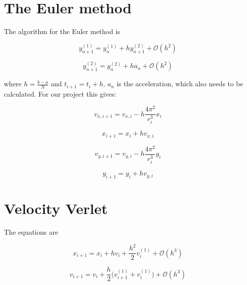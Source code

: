 \documentclass[11pt]{article}
\begin{document}
\section{The Euler method}

\begin{flushleft}
The algorithm for the Euler method is

\begin{equation}
y^{(1)}_{n+1} = y_n^{(1)} + hy_{n+1}^{(2)} + \mathcal{O}(h^2) 
\end{equation}

\begin{equation}
y^{(2)}_{n+1} = y^{(2)}_n +ha_n + \mathcal{O}(h^2)
\end{equation}


where $h = \frac{b-a}{N}$ and $t_{i+1} = t_i + h$. $a_n$ is the acceleration, which also needs to be calculated. For our project this gives: 

\begin{equation}
v_{x,i+1} = v_{x,i} - h \frac{4 \pi^2}{r_i^3} x_i
\end{equation}

\begin{equation}
x_{i+1} = x_i + hv_{x,i}
\end{equation}

\begin{equation}
v_{y,i+1} = v_{y,i} - h \frac{4 \pi^2}{r_i^3} y_i
\end{equation}

\begin{equation}
y_{i+1} = y_i + hv_{y,i}
\end{equation}
\end{flushleft}

\section{Velocity Verlet}

\begin{flushleft}
The equations are

\begin{equation}
x_{i+1} = x_i + hv_i + \frac{h^2}{2} v_i^{(1)} + \mathcal{O}(h^3)
\end{equation}

\begin{equation}
v_{i+1} = v_i + \frac{h}{2} \Big(v_{i+1}^{(1)} +v_i^{(1)} \Big) + \mathcal{O}(h^3)
\end{equation}
\end{flushleft}
\end{document}
